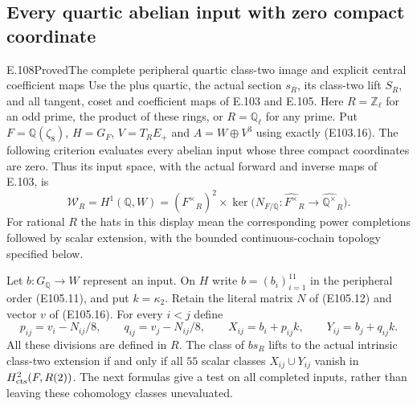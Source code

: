 \subsection*{Every quartic abelian input with zero compact coordinate}
\begin{statement}{E.108}{Proved}{The complete peripheral quartic class-two image and explicit central coefficient maps}
Use the plus quartic, the actual section $s_R$, its class-two
lift $S_R$, and all tangent, coset and coefficient maps of
E.103 and E.105.  Here $R=\mathbb Z_\ell$ for an odd prime,
the product of these rings, or $R=\mathbb Q_\ell$ for any prime.
Put $F=\mathbb Q(\zeta_8)$, $H=G_F$, $V=T_RE_+$ and
$A=W\oplus V^3$ using exactly (E103.16).
The following criterion evaluates every abelian input
whose three compact coordinates are zero.  Thus its input
space, with the actual forward and inverse maps of E.103, is
\[
 \mathcal W_R=H^1(\mathbb Q,W)
   = (\widehat{F^\times}_R)^2\times
       \ker\bigl(N_{F/\mathbb Q}:\widehat{F^\times}_R
                                      \longrightarrow\widehat{\mathbb Q^\times}_R\bigr).
 \tag{E108.1}
\]
For rational $R$ the hats in this display mean the corresponding
power completions followed by scalar extension, with the bounded
continuous-cochain topology specified below.

Let $b:G_{\mathbb Q}\to W$ represent an input.  On $H$ write
$b=(b_i)_{i=1}^{11}$ in the peripheral order (E105.11), and
put $k=\kappa_2$.  Retain the literal matrix $N$ of (E105.12)
and vector $v$ of (E105.16).  For every $i<j$ define
\[
 p_{ij}=v_i-N_{ij}/8,\qquad q_{ij}=v_j-N_{ij}/8,\qquad
 X_{ij}=b_i+p_{ij}k,\qquad Y_{ij}=b_j+q_{ij}k.
 \tag{E108.2}
\]
All these divisions are defined in $R$.  The class of $b s_R$
lifts to the actual intrinsic class-two extension if and only if
all $55$ scalar classes $X_{ij}\cup Y_{ij}$ vanish in
$H^2_{\rm cts}(F,R(2))$.  The next formulas give a test on all
completed inputs, rather than leaving these cohomology classes
unevaluated.


\end{statement}
